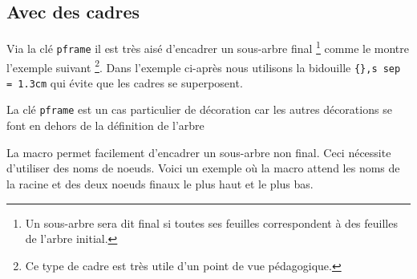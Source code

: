 \documentclass[12pt,a4paper]{article}
\begin{document}

\subsection{Avec des cadres}


Via la clé \verb#pframe# il est très aisé d'encadrer un sous-arbre final
\footnote{ 
	Un sous-arbre sera dit final si toutes ses feuilles correspondent à des feuilles de l'arbre initial. 
}
comme le montre l'exemple suivant
\footnote{ 
	Ce type de cadre est très utile d'un point de vue pédagogique. 
}.
Dans l'exemple ci-après nous utilisons la bidouille \verb+{},s sep = 1.3cm+ qui évite que les cadres se superposent.



\begin{remark}
	La clé \verb#pframe# est un cas particulier de décoration car les autres décorations se font en dehors de la définition de l'arbre
\end{remark}





La macro  permet facilement d'encadrer un sous-arbre non final.
Ceci nécessite d'utiliser des noms de noeuds.
Voici un exemple où la macro  attend les noms de la racine et des deux noeuds finaux le plus haut et le plus bas.

\end{document}
